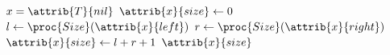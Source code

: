 \begin{codebox}
\li \If $x = \attrib{T}{nil}$
\li \Then
        $\attrib{x}{size} \gets 0$
\li \Else
\li   	  	$l \gets \proc{Size}(\attrib{x}{left})$
\li     $r \gets \proc{Size}(\attrib{x}{right})$
\li     $\attrib{x}{size} \gets l + r + 1$
    \End
\li \Return $\attrib{x}{size}$
\end{codebox}